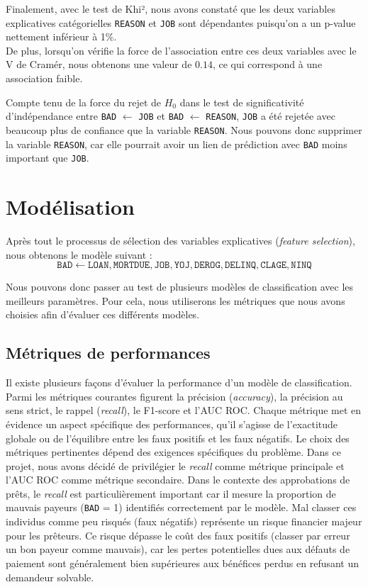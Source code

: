 \documentclass[a4paper,12pt]{report}
\begin{document}
\bigbreak

Finalement, avec le test de Khi², nous avons constaté que les deux variables explicatives catégorielles \texttt{REASON} et \texttt{JOB} sont dépendantes 
puisqu'on a un p-value nettement inférieur à 1\%.\\
De plus, lorsqu'on vérifie la force de l'association entre ces deux variables avec le V de Cramér, nous obtenons une valeur de $0.14$, ce qui correspond à une association faible.

Compte tenu de la force du rejet de $H_0$ dans le test de significativité d'indépendance entre \texttt{BAD} $\leftarrow$ \texttt{JOB} et \texttt{BAD} $\leftarrow$ \texttt{REASON}, \texttt{JOB} a été rejetée avec beaucoup plus de confiance que la variable \texttt{REASON}. Nous pouvons donc supprimer la variable \texttt{REASON}, car elle pourrait avoir un lien de prédiction avec \texttt{BAD} moins important que \texttt{JOB}.

\pagebreak

\section{Modélisation}

Après tout le processus de sélection des variables explicatives (\textit{feature selection}), nous obtenons le modèle suivant :  
\[
\texttt{BAD} \leftarrow \texttt{LOAN}, \texttt{MORTDUE}, \texttt{JOB}, \texttt{YOJ}, \texttt{DEROG}, \texttt{DELINQ}, \texttt{CLAGE}, \texttt{NINQ}
\]

Nous pouvons donc passer au test de plusieurs modèles de classification avec les meilleurs paramètres.  
Pour cela, nous utiliserons les métriques que nous avons choisies afin d'évaluer ces différents modèles.


\subsection{Métriques de performances}

Il existe plusieurs façons d’évaluer la performance d’un modèle de classification. Parmi les métriques courantes figurent la précision (\textit{accuracy}), la précision au sens strict, le rappel (\textit{recall}), le F1-score et l’AUC ROC. Chaque métrique met en évidence un aspect spécifique des performances, qu’il s’agisse de l’exactitude globale ou de l’équilibre entre les faux positifs et les faux négatifs. Le choix des métriques pertinentes dépend des exigences spécifiques du problème.
\bigbreak
Dans ce projet, nous avons décidé de privilégier le \textit{recall} comme métrique principale et l’AUC ROC comme métrique secondaire.
\bigbreak
Dans le contexte des approbations de prêts, le \textit{recall} est particulièrement important car il mesure la proportion de mauvais payeurs (\texttt{BAD} = 1) identifiés correctement par le modèle. Mal classer ces individus comme peu risqués (faux négatifs) représente un risque financier majeur pour les prêteurs. Ce risque dépasse le coût des faux positifs (classer par erreur un bon payeur comme mauvais), car les pertes potentielles dues aux défauts de paiement sont généralement bien supérieures aux bénéfices perdus en refusant un demandeur solvable.
\end{document}

